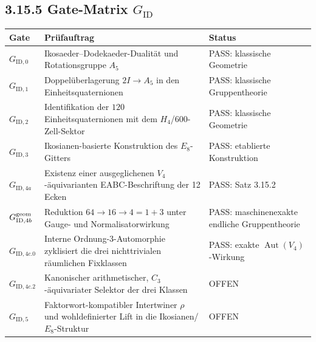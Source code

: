 \documentclass[11pt,a4paper]{article}
\begin{document}
\subsection*{3.15.5 Gate-Matrix $G_{\mathrm{ID}}$}
\begin{center}
\begin{tabularx}{\textwidth}{>{\bfseries}l X l}
\toprule
Gate & Prüfauftrag & Status\\
\midrule
$G_{\mathrm{ID},0}$ & Ikosaeder--Dodekaeder-Dualität und Rotationsgruppe $A_5$ & PASS: klassische Geometrie\\
$G_{\mathrm{ID},1}$ & Doppelüberlagerung $2I\to A_5$ in den Einheitsquaternionen & PASS: klassische Gruppentheorie\\
$G_{\mathrm{ID},2}$ & Identifikation der $120$ Einheitsquaternionen mit dem $H_4$/600-Zell-Sektor & PASS: klassische Geometrie\\
$G_{\mathrm{ID},3}$ & Ikosianen-basierte Konstruktion des $E_8$-Gitters & PASS: etablierte Konstruktion\\
$G_{\mathrm{ID},4a}$ & Existenz einer ausgeglichenen $V_4$-äquivarianten EABC-Beschriftung der 12 Ecken & PASS: Satz 3.15.2\\
$G_{\mathrm{ID},4b}^{\rm geom}$ & Reduktion $64\to16\to4=1+3$ unter Gauge- und Normalisatorwirkung & PASS: maschinenexakte endliche Gruppentheorie\\
$G_{\mathrm{ID},4c.0}$ & Interne Ordnung-$3$-Automorphie zyklisiert die drei nichttrivialen räumlichen Fixklassen & PASS: exakte $\operatorname{Aut}(V_4)$-Wirkung\\
$G_{\mathrm{ID},4c.2}$ & Kanonischer arithmetischer, $C_3$-äquivariater Selektor der drei Klassen & OFFEN\\
$G_{\mathrm{ID},5}$ & Faktorwort-kompatibler Intertwiner $\rho$ und wohldefinierter Lift in die Ikosianen/$E_8$-Struktur & OFFEN\\
\bottomrule
\end{tabularx}
\end{center}
\end{document}
